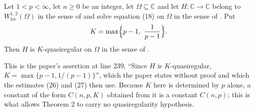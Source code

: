 \begin{lemma}
Let $1<p<\infty$, let $n\ge0$ be an integer, let $\Omega\subseteq\mathbb{C}$ and
let $H\colon\mathbb{C}\to\mathbb{C}$ belong to $W^{1,2}_{\mathrm{loc}}(\Omega)$
in the sense of  and solve equation (18) on $\Omega$ in the
sense of .  Put
\[
  K=\max\Bigl\{p-1,\ \frac1{p-1}\Bigr\} .
\]
Then $H$ is $K$-quasiregular on $\Omega$ in the sense of
.

This is the paper's assertion at line 239, ``Since $H$ is $K$-quasiregular,
$K=\max\{p-1,1/(p-1)\}$'', which the paper states without proof and which the
estimates (26) and (27) then use.  Because $K$ here is determined by $p$ alone,
a constant of the form $C(n,p,K)$ obtained from it is a constant $C(n,p)$;
this is what allows Theorem 2 to carry no quasiregularity hypothesis.
\end{lemma}
